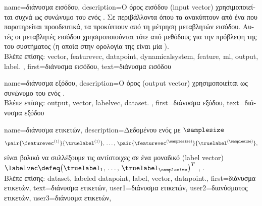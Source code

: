 {name={\foreignlanguage{greek}{διάνυσμα εισόδου}},
	description={\foreignlanguage{greek}{Ο όρος}  \foreignlanguage{greek}{εισόδου} 
		(input vector) \foreignlanguage{greek}{χρησιμοποι\-εί\-ται συχνά ως συνώνυμο του}  \foreignlanguage{greek}{ενός}
		. \foreignlanguage{greek}{Σε περιβάλλοντα όπου τα}  \foreignlanguage{greek}{ανακύπτουν
		από ένα}  \foreignlanguage{greek}{που παρατηρείται προοδευτικά, τα}  
		\foreignlanguage{greek}{προκύπτουν από τη μέτρηση μεταβλητών εισόδου. Αυτές οι μεταβλητές εισόδου χρησιμοποιούνται τότε από 
		μεθόδους}   \foreignlanguage{greek}{για την πρόβλεψη της}  \foreignlanguage{greek}{του συστήματος 
		(η οποία στην ορολογία της}  \foreignlanguage{greek}{είναι μία} ).
		\\
		\foreignlanguage{greek}{Βλέπε επίσης:} \gls{vector}, \gls{featurevec}, \gls{datapoint}, \gls{dynamicalsystem}, \gls{feature}, \gls{ml}, 
		\gls{output}, \gls{label}. }, 
 	first={\foreignlanguage{greek}{διάνυσμα εισόδου}}, 
 	text={\foreignlanguage{greek}{διάνυσμα εισόδου}}
}

{name={\foreignlanguage{greek}{διάνυσμα εξόδου}},
	description={\foreignlanguage{greek}{Ο όρος}   
		(output vector) \foreignlanguage{greek}{χρησιμοποιείται ως συνώνυμο του} 
 		 \foreignlanguage{greek}{ενός}  \cite{Murphy2012}.
		\\
		\foreignlanguage{greek}{Βλέπε επίσης:} \gls{output}, \gls{vector}, \gls{labelvec}, \gls{dataset}. },  
 	first={\foreignlanguage{greek}{διάνυσμα εξόδου}}, 
 	text={\foreignlanguage{greek}{διάνυσμα εξόδου}}
}

{name={\foreignlanguage{greek}{διάνυσμα ετικετών}},
	description={\foreignlanguage{greek}{Δεδομένου ενός}  
		\foreignlanguage{greek}{με} $\samplesize$  
		$$\pair{\featurevec^{(1)}}{\truelabel^{(1)}}, \,\ldots, \,\pair{\featurevec^{(\samplesize)}}{\truelabel^{(\samplesize)}},$$ 
		\foreignlanguage{greek}{είναι βολικό να συλλέξουμε τις αντίστοιχες}  \foreignlanguage{greek}{σε ένα μοναδικό} 
		  (label vector) $\labelvec \defeq \big( \truelabel_{1},\,\ldots,\,\truelabel_{\samplesize}\big)^{T}$ 
 		\cite{BishopBook}, \cite{hastie01statisticallearning}. 
 		\\
 		\foreignlanguage{greek}{Βλέπε επίσης:} \gls{dataset}, \gls{labeled datapoint}, \gls{label}, \gls{vector}, \gls{datapoint}.},
 	first={\foreignlanguage{greek}{διάνυσμα ετικετών}},
 	text={\foreignlanguage{greek}{διάνυσμα ετικετών}},
	user1={\foreignlanguage{greek}{διάνυσμα ετικετών}}, %
  	user2={\foreignlanguage{greek}{διανύσματος ετικετών}}, %
	user3={\foreignlanguage{greek}{διάνυσμα ετικετών}}, %
}

